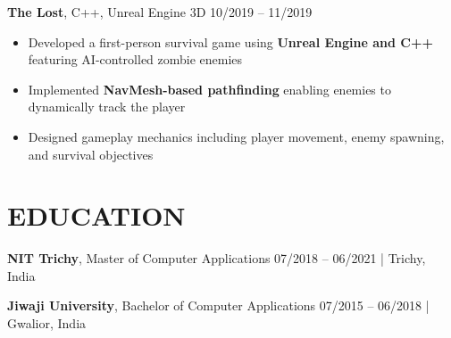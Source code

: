 \documentclass[11.9pt,a4paper]{article}
\begin{document}
\vspace{5pt}

\noindent
\textbf{The Lost}, C++, Unreal Engine 3D \hfill 10/2019 -- 11/2019
\begin{itemize}
  \item Developed a first-person survival game using \textbf{Unreal Engine and C++} featuring AI-controlled zombie enemies
  \item Implemented \textbf{NavMesh-based pathfinding} enabling enemies to dynamically track the player
  \item Designed gameplay mechanics including player movement, enemy spawning, and survival objectives
\end{itemize}

\section*{EDUCATION}

\noindent
\textbf{NIT Trichy}, Master of Computer Applications \hfill 07/2018 -- 06/2021 | Trichy, India

\vspace{5pt}

\noindent
\textbf{Jiwaji University}, Bachelor of Computer Applications \hfill 07/2015 -- 06/2018 | Gwalior, India

\vspace{6pt}
\end{document}
